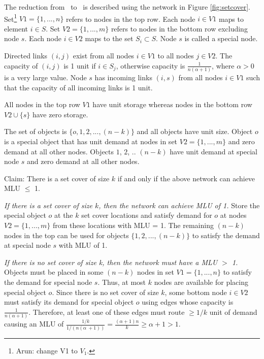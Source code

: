 {The reduction from \setcover\ to \optloc\ is described using the network in Figure \ref{fig:setcover}. Set\footnote{Arun: change V1 to $V_1$.}  $V1 = \{1, ..., n\}$  refers to nodes in the top row. Each node $i \in V1$ maps to element $i \in S$. Set $V2 = \{1, ..., m\}$ refers to nodes in the bottom row excluding node $s$. Each node $i \in V2$ maps to the set $S_i \subset S$. Node $s$ is called a special node. 


Directed links $(i, j)$ exist from all nodes $i \in V1$ to all nodes $j \in V2$. The capacity of $(i,j)$ is 1 unit if $i \in S_j$, otherwise capacity is $\frac{1}{n(\alpha + 1)}$, where $\alpha > 0$ is a very large value. Node $s$ has incoming links $(i, s)$ from all nodes  $i \in V1$ such that  the capacity of all incoming links is 1 unit.

All nodes in the top row $V1$ have unit storage whereas nodes in the bottom row $V2\cup \{s\}$ have zero storage.

The set of objects is $\{o, 1, 2, ..., (n-k)\}$ and all objects have unit size. Object $o$ is a special object that has unit demand at nodes in set $V2 = \{1, ..., m\}$ and zero demand at all other nodes. Objects $1$, $2$, .. $(n-k)$ have unit demand at special node $s$ and zero demand at all other nodes. 


{\sc Claim:} There is a set cover of size $k$ if and only if the above network can achieve MLU $\leq$ 1.

\emph{If there is a set cover of size $k$, then the network can achieve MLU of 1.} Store the special object $o$ at the $k$ set cover locations and satisfy demand for $o$ at nodes  $V2 = \{1, ..., m\}$ from these locations with MLU = 1. The remaining $(n-k)$ nodes in the top can be used for objects $\{1, 2, ..., (n-k)\}$ to satisfy the demand at special node $s$ with MLU of 1.

\emph{If there is no set cover of size k, then the network must have a MLU $>$ 1.} Objects must be placed in some $(n-k)$ nodes in set $V1 = \{1, ..., n\}$ to satisfy the demand for special node $s$. Thus, at most $k$ nodes are available for placing special object $o$. Since there is no set cover of size $k$,  some bottom node $i \in V2$  must satisfy its demand for special object $o$ using edges whose capacity is $\frac{1}{n(\alpha + 1)}$. Therefore, at least one of these edges must route $\geq 1/k$ unit of demand causing an MLU of 
$\frac{1/k}{1/(n(\alpha\ + 1))} = \frac{(\alpha + 1)n}{k} \geq \alpha + 1 > 1$. 

}
